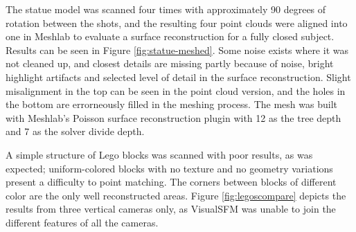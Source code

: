 The statue model was scanned four times with approximately 90 degrees of rotation between the shots, and the resulting four point clouds were aligned into one in Meshlab to evaluate a surface reconstruction for a fully closed subject.
Results can be seen in Figure \ref{fig:statue-meshed}.
Some noise exists where it was not cleaned up, and closest details are missing partly because of noise, bright highlight artifacts and selected level of detail in the surface reconstruction.
Slight misalignment in the top can be seen in the point cloud version, and the holes in the bottom are errorneously filled in the meshing process.
The mesh was built with Meshlab's Poisson surface reconstruction plugin with 12 as the tree depth and 7 as the solver divide depth.


A simple structure of Lego blocks was scanned with poor results, as was expected; uniform-colored blocks with no texture and no geometry variations present a difficulty to point matching.
The corners between blocks of different color are the only well reconstructed areas.
Figure \ref{fig:legoscompare} depicts the results from three vertical cameras only, as VisualSFM was unable to join the different features of all the cameras.



